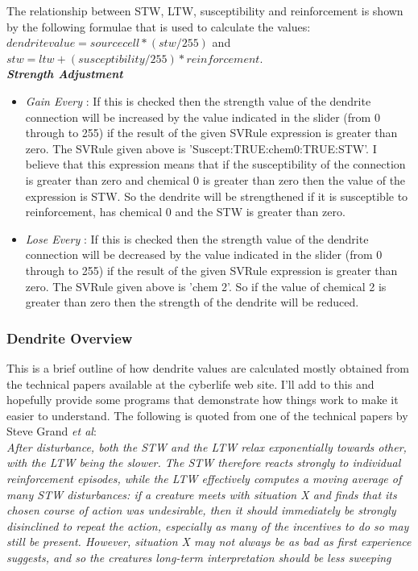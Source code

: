 \documentclass[11pt,twoside,a4paper]{article}
\begin{document}
The relationship between STW, LTW, susceptibility and reinforcement is shown by the following formulae that is used to calculate the values: 
$dendrite value = source cell * ( stw / 255 )$ and $stw = ltw + ( susceptibility / 255 ) * reinforcement$.~\\

\textbf{\textit{Strength Adjustment}}
\begin{itemize}
	\item[] \emph{Gain Every} : If this is checked then the strength value of the dendrite connection will be increased by the value indicated in the slider (from 0 through to 255) if the result of the given SVRule expression is greater than zero. The SVRule given above is 'Suscept:TRUE:chem0:TRUE:STW'. I believe that this expression means that if the susceptibility of the connection is greater than zero and chemical 0 is greater than zero then the value of the expression is STW. So the dendrite will be strengthened if it is susceptible to reinforcement, has chemical 0 and the STW is greater than zero.
	\item[] \emph{Lose Every} : If this is checked then the strength value of the dendrite connection will be decreased by the value indicated in the slider (from 0 through to 255) if the result of the given SVRule expression is greater than zero. The SVRule given above is 'chem 2'. So if the value of chemical 2 is greater than zero then the strength of the dendrite will be reduced.
\end{itemize}

\subsubsection{Dendrite Overview}

This is a brief outline of how dendrite values are calculated mostly obtained from the technical papers available at the cyberlife web site. I'll add to this and hopefully provide some programs that demonstrate how things work to make it easier to understand. The following is quoted from one of the technical papers by Steve Grand \textit{et al}:~\\


\emph{After disturbance, both the STW and the LTW relax exponentially towards other, with the LTW being the slower. The STW therefore reacts strongly to individual reinforcement episodes, while the LTW effectively computes a moving average of many STW disturbances: if a creature meets with situation X and finds that its chosen course of action was undesirable, then it should immediately be strongly disinclined to repeat the action, especially as many of the incentives to do so may still be present. However, situation X may not always be as bad as first experience suggests, and so the creatures long-term interpretation should be less sweeping}~\\
\end{document}
